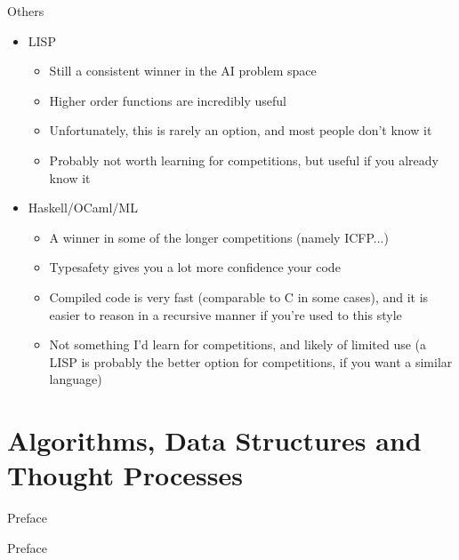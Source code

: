 \documentclass{beamer}
\begin{document}
\begin{frame}{Others}
  \begin{centering}
    \begin{itemize}
      \item LISP
      \begin{itemize}
        \item Still a consistent winner in the AI problem space
        \item Higher order functions are incredibly useful
        \item Unfortunately, this is rarely an option, and most people don't know it
        \item Probably not worth learning for competitions, but useful if you already know it
      \end{itemize}
      \item Haskell/OCaml/ML
      \begin{itemize}
        \item A winner in some of the longer competitions (namely ICFP...)
        \item Typesafety gives you a lot more confidence your code
        \item Compiled code is very fast (comparable to C in some cases), and it is easier to reason in a recursive manner if you're used to this style
        \item Not something I'd learn for competitions, and likely of limited use (a LISP is probably the better option for competitions, if you want a similar language)
      \end{itemize}
    \end{itemize}
  \end{centering}
\end{frame}


\section{Algorithms, Data Structures and Thought Processes}

\begin{frame}{Preface}
  \begin{centering}
    \huge{Preface}
  \end{centering}
\end{frame}
\end{document}
